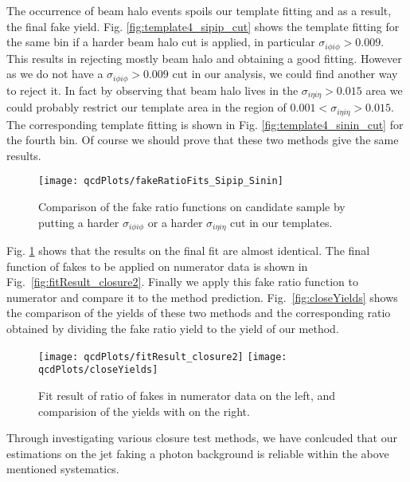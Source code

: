 The occurrence of beam halo events spoils our template fitting and as a result, the final fake yield. Fig. \ref{fig:template4_sipip_cut} shows the template fitting
for the same bin if a harder beam halo cut is applied, in particular $\sigma_{i\phi i\phi} > 0.009$. This results in rejecting mostly beam halo and obtaining a good fitting. 
However as we do not have a $\sigma_{i\phi i\phi} > 0.009$ cut in our analysis, we could find another way to reject it. In fact by observing that beam halo lives in the 
$\sigma_{i\eta i\eta} > 0.015$ area we could probably restrict our template area in the region of $0.001 < \sigma_{i\eta i\eta} > 0.015$. The corresponding template fitting 
is shown in Fig. \ref{fig:template4_sinin_cut} for the fourth bin. Of course we should prove that these two methods give the same results.

\begin{figure}[hbtp]
\begin{center}
\texttt{[image: qcdPlots/fakeRatioFits\_Sipip\_Sinin]}
\caption{Comparison of the fake ratio functions on candidate sample by putting a harder $\sigma_{i\phi i\phi}$ or a harder $\sigma_{i\eta i\eta}$ cut in our templates.}
\label{fig:fakeRatioFits_Sipip_Sinin}
\end{center}
\end{figure}

Fig. \ref{fig:fakeRatioFits_Sipip_Sinin} shows that the results on the final fit are almost identical. The final function of fakes to be applied on numerator data is 
shown in Fig.~\ref{fig:fitResult_closure2}.
Finally we apply this fake ratio function to numerator and compare it to the method prediction. Fig.~\ref{fig:closeYields} shows the comparison of the yields of these  two methods and the corresponding ratio obtained by dividing the fake ratio yield to the yield of our method.

\begin{figure}[hbtp]
\begin{center}
{\label{fig:fitResult_closure2}\texttt{[image: qcdPlots/fitResult\_closure2]}}
{\label{fig:closeYields}\texttt{[image: qcdPlots/closeYields]}}
\caption{Fit result of ratio of fakes in numerator data on the left, and comparision of the yields with on the right.}
\label{fig:fitResult_closure2_all}
\end{center}
\end{figure}

Through investigating various closure test methods, we have conlcuded that our estimations on the jet faking a photon background is reliable within the above mentioned systematics.

